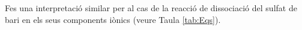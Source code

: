 \begin{exr}
    Fes una interpretació similar per al cas de la reacció de dissociació del sulfat de bari en els seus components iònics (veure Taula \ref{tab:Eqs}).
    \end{exr}